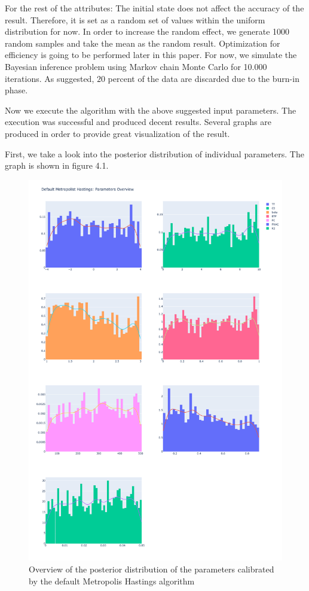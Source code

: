 For the rest of the attributes: The initial state does not affect the accuracy of the result\cite{mcmc_practice}. Therefore, it is set as a random set of values within the uniform distribution for now. In order to increase the random effect, we generate 1000 random samples and take the mean as the random result. Optimization for efficiency is going to be performed later in this paper. For now, we simulate the Bayesian inference problem using Markov chain Monte Carlo for 10.000 iterations. As suggested, $20$ percent of the data are discarded due to the burn-in phase.\cite{20per_burnin}


Now we execute the algorithm with the above suggested input parameters. The execution was successful and produced decent results. Several graphs are produced in order to provide great visualization of the result. 

First, we take a look into the posterior distribution of individual parameters. The graph is shown in figure 4.1.

\begin{figure}
    \centering
    \includegraphics[width=1\textwidth]{figures/basic_mh/default_mh/default_mh_parameters_overview.png}
    \captionsetup{width=.8\textwidth}
    \caption{Overview of the posterior distribution of the parameters calibrated by the default Metropolis Hastings algorithm}
    \label{fig:enter-label}
\end{figure}


